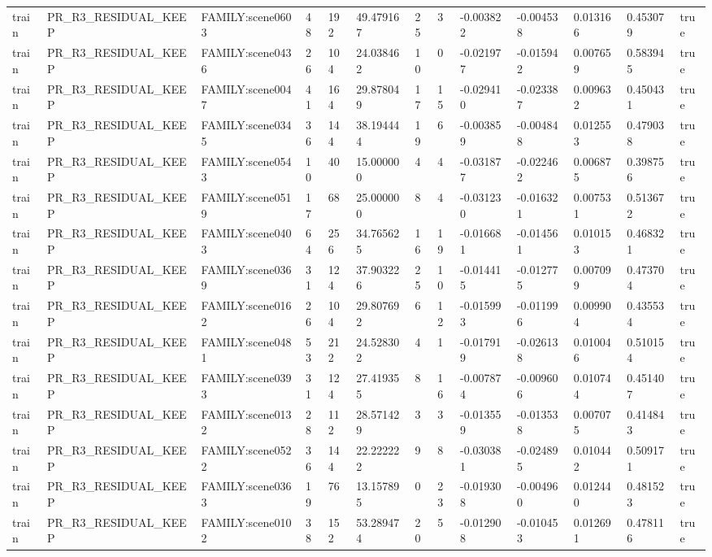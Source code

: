 \begin{tabular}{lllllllllllll}
train & PR\_R3\_RESIDUAL\_KEEP & FAMILY:scene0603 & 48 & 192 & 49.479167 & 25 & 3 & -0.003822 & -0.004538 & 0.013166 & 0.453079 & true \\
train & PR\_R3\_RESIDUAL\_KEEP & FAMILY:scene0436 & 26 & 104 & 24.038462 & 10 & 0 & -0.021977 & -0.015942 & 0.007659 & 0.583945 & true \\
train & PR\_R3\_RESIDUAL\_KEEP & FAMILY:scene0047 & 41 & 164 & 29.878049 & 17 & 15 & -0.029410 & -0.023387 & 0.009632 & 0.450431 & true \\
train & PR\_R3\_RESIDUAL\_KEEP & FAMILY:scene0345 & 36 & 144 & 38.194444 & 19 & 6 & -0.003859 & -0.004848 & 0.012553 & 0.479038 & true \\
train & PR\_R3\_RESIDUAL\_KEEP & FAMILY:scene0543 & 10 & 40 & 15.000000 & 4 & 4 & -0.031877 & -0.022462 & 0.006875 & 0.398756 & true \\
train & PR\_R3\_RESIDUAL\_KEEP & FAMILY:scene0519 & 17 & 68 & 25.000000 & 8 & 4 & -0.031230 & -0.016321 & 0.007531 & 0.513672 & true \\
train & PR\_R3\_RESIDUAL\_KEEP & FAMILY:scene0403 & 64 & 256 & 34.765625 & 16 & 19 & -0.016681 & -0.014561 & 0.010153 & 0.468321 & true \\
train & PR\_R3\_RESIDUAL\_KEEP & FAMILY:scene0369 & 31 & 124 & 37.903226 & 25 & 10 & -0.014415 & -0.012775 & 0.007099 & 0.473704 & true \\
train & PR\_R3\_RESIDUAL\_KEEP & FAMILY:scene0162 & 26 & 104 & 29.807692 & 6 & 12 & -0.015993 & -0.011996 & 0.009904 & 0.435534 & true \\
train & PR\_R3\_RESIDUAL\_KEEP & FAMILY:scene0481 & 53 & 212 & 24.528302 & 4 & 1 & -0.017919 & -0.026138 & 0.010046 & 0.510154 & true \\
train & PR\_R3\_RESIDUAL\_KEEP & FAMILY:scene0393 & 31 & 124 & 27.419355 & 8 & 16 & -0.007874 & -0.009606 & 0.010744 & 0.451407 & true \\
train & PR\_R3\_RESIDUAL\_KEEP & FAMILY:scene0132 & 28 & 112 & 28.571429 & 3 & 3 & -0.013559 & -0.013538 & 0.007075 & 0.414843 & true \\
train & PR\_R3\_RESIDUAL\_KEEP & FAMILY:scene0522 & 36 & 144 & 22.222222 & 9 & 8 & -0.030381 & -0.024895 & 0.010442 & 0.509171 & true \\
train & PR\_R3\_RESIDUAL\_KEEP & FAMILY:scene0363 & 19 & 76 & 13.157895 & 0 & 23 & -0.019308 & -0.004960 & 0.012440 & 0.481523 & true \\
train & PR\_R3\_RESIDUAL\_KEEP & FAMILY:scene0102 & 38 & 152 & 53.289474 & 20 & 5 & -0.012908 & -0.010453 & 0.012691 & 0.478116 & true \\

\end{tabular}
